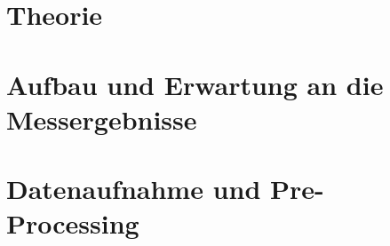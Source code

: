 \documentclass[11pt,a4paper,twoside,headsepline,numbers=noenddot,toc=bibliography,cleardoublepage=empty,parskip=half,DIV=calc,BCOR=6mm,pagesize=pdftex]{article}
\begin{document}
	
\pagestyle{empty}





\clearpage
\mbox{}
\clearpage
\pagestyle{plain}


% 


\tableofcontents
\clearpage
{}
\setcounter{page}{1}



\section{Theorie}
\label{sec:Theorie}

\clearpage

\section{Aufbau und Erwartung an die Messergebnisse}
\label{sec:Aufbau}

\clearpage

\section{Datenaufnahme und Pre-Processing}
\label{sec:Datenaufnahme und Pre-Processing}

\clearpage

\end{document}
